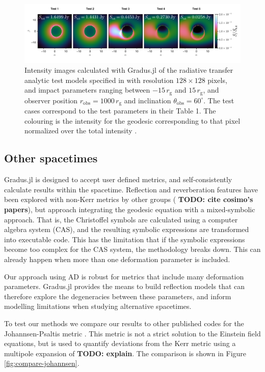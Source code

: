\documentclass[fleqn,usenatbib]{mnras}
\newcommand{\todo}[1]{{\noindent \bf \color{red} TODO: #1}}
\newcommand{\Gradus}{Gradus.jl }
\newcommand{\rg}{r_\text{g}}
\begin{document}
\begin{figure}
	\centering
	\includegraphics[width=0.99\linewidth]{figures/radiative-transfer.gold.pdf}
	\caption{Intensity images calculated with \Gradus of the radiative transfer analytic test models specified in \citet{gold_verification_2020} with resolution $128 \times 128$ pixels, and impact parameters ranging between $-15\, \rg$ and $15\, \rg$, and observer position $r_\text{obs} = 1000\, \rg$ and inclination $\theta_\text{obs} = 60^\circ$. The test cases correspond to the test parameters in their Table 1. The colouring is the intensity for the geodesic corresponding to that pixel normalized over the total intensity .}
	\label{fig:gold-test-problems}
\end{figure}

\subsection{Other spacetimes}

\Gradus is designed to accept user defined metrics, and self-consistently
calculate results within the spacetime. Reflection and reverberation features
have been explored with non-Kerr metrics by other groups (\todo{cite cosimo's
papers}), but approach integrating the geodesic equation with a mixed-symbolic
approach. That is, the Christoffel symbols are calculated using a computer
algebra system (CAS), and the resulting symbolic expressions are transformed
into executable code.  This has the limitation that if the symbolic expressions
become too complex for the CAS system, the methodology breaks down. This can
already happen when more than one deformation parameter is included.

Our approach using AD is robust for metrics that include many deformation
parameters. \Gradus provides the means to build reflection models that can
therefore explore the degeneracies between these parameters, and inform
modelling limitations when studying alternative spacetimes.

To test our methods we compare our results to other published codes for the
Johannsen-Psaltis metric \cite{johannsen_regular_2013}. This metric is not a
strict solution to the Einstein field equations, but is used to quantify
deviations from the Kerr metric using a multipole expansion of \todo{explain}.
The comparison is shown in Figure \ref{fig:compare-johannsen}.
\end{document}
